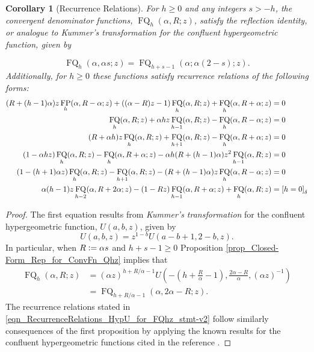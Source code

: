 \documentclass[12pt,reqno]{article}
\renewenvironment{subequations}{%
  \refstepcounter{equation}%
  \edef\theparentequation{\theequation}%
  \setcounter{parentequation}{\value{equation}}%
  \setcounter{equation}{0}%
  \def\theequation{\theparentequation.\alph{equation}}%
  \ignorespaces
}{%
  \setcounter{equation}{\value{parentequation}}%
  \ignorespacesafterend
}
\numberwithin{sfootnote}{section}
\numberwithin{equation}{section}
\theoremstyle{plain}
\newtheorem{cor}[theorem]{Corollary}
\theoremstyle{definition}
\theoremstyle{remark}
\newcommand{\defequals}{\ensuremath{\vcentcolon=}}
\newcommand{\StartGroupingSubEquations}{\begin{subequations}}
\newcommand{\EndGroupingSubEquations}{\end{subequations}}
\newcommand{\Iverson}[1]{\ensuremath{\left[#1\right]_{\delta}}}
\newcommand{\HypU}[3]{\ensuremath{U\left(#1, #2, #3\right)}}
\DeclareMathOperator{\FP}{FP}
\DeclareMathOperator{\FQ}{FQ}
\begin{document}
\begin{cor}[Recurrence Relations] 
\label{cor_HypU-Based_recurrences_for_FQhz} 
For $h \geq 0$ and any integers $s > -h$, the convergent denominator functions, 
$\FQ_h(\alpha, R; z)$, satisfy the reflection identity, or 
analogue to \emph{Kummer's transformation} for the 
confluent hypergeometric function, given by 
\StartGroupingSubEquations 
\begin{equation} 
\label{eqn_RecurrenceRelations_HypU_for_FQhz_stmt-v1} 
\FQ_h(\alpha, \alpha s; z) = \FQ_{h+s-1}(\alpha; \alpha (2-s); z). 
\end{equation} 
Additionally, for $h \geq 0$ these functions satisfy 
recurrence relations of the following forms: 
\begin{align} 
\label{eqn_RecurrenceRelations_HypU_for_FQhz_stmt-v2} 
(R+(h-1)\alpha) z \FP_h(\alpha, R-\alpha; z) + ((\alpha-R) z-1) 
     \FQ_h(\alpha, R; z) + \FQ_h(\alpha, R+\alpha; z) & = 0 \\ 
\notag 
\FQ_h(\alpha, R; z) + \alpha h z \FQ_{h-1}(\alpha, R; z) - 
     \FQ_h(\alpha, R-\alpha; z) & = 0 \\ 
\notag 
(R+\alpha h) z \FQ_h(\alpha, R; z) + \FQ_{h+1}(\alpha, R; z) - 
     \FQ_{h}(\alpha, R+\alpha; z) & = 0 \\ 
\notag 
(1-\alpha h z) \FQ_h(\alpha, R; z) - \FQ_h(\alpha, R+\alpha; z) - 
     \alpha h (R + (h - 1) \alpha) z^2 \FQ_{h-1}(\alpha, R; z) & = 0 \\ 
\notag 
(1-(h+1) \alpha z) \FQ_h(\alpha, R; z) - \FQ_{h+1}(\alpha, R; z) - 
     (R + (h-1) \alpha) z \FQ_h(\alpha, R-\alpha; z) & = 0 \\ 
\notag 
\alpha (h-1) z \FQ_{h-2}(\alpha, R+2\alpha; z) - (1-Rz) 
     \FQ_{h-1}(\alpha, R+\alpha; z) + \FQ_h(\alpha, R; z) & = \Iverson{h = 0} 
\end{align} 
\EndGroupingSubEquations 
\end{cor} 
\begin{proof} 
The first equation results from \textit{Kummer's transformation} 
for the confluent hypergeometric function, $\HypU{a}{b}{z}$, 
given by \citep[\S 13.2(vii)]{NISTHB} 
\begin{equation*} 
\HypU{a}{b}{z} = z^{1-b} \HypU{a-b+1}{2-b}{z}. 
\end{equation*} 
In particular, when $R \defequals \alpha s$ and $h+s-1 \geq 0$ 
Proposition \ref{prop_Closed-Form_Rep_for_ConvFn_Qhz} 
implies that 
\begin{align*} 
\FQ_h(\alpha, R; z) & = \left(\alpha z\right)^{h+R/\alpha - 1} 
     \HypU{-(h+\frac{R}{\alpha}-1)}{\frac{2\alpha-R}{\alpha}}{ 
     (\alpha z)^{-1}} \\ 
   & = 
     \FQ_{h+R/\alpha - 1}(\alpha, 2\alpha-R; z). 
\end{align*} 
The recurrence relations stated in 
\eqref{eqn_RecurrenceRelations_HypU_for_FQhz_stmt-v2} follow 
similarly consequences of the first proposition by 
applying the known results for the 
confluent hypergeometric functions cited in the reference 
\citep[\S 13.3(i)]{NISTHB}. 
\end{proof} 
\end{document}
